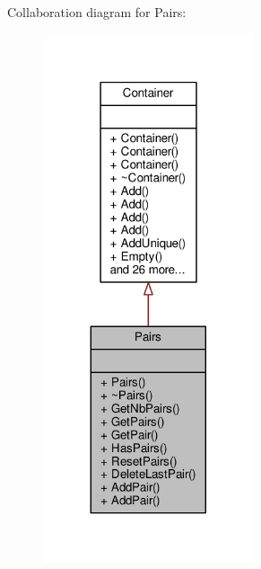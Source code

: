 Collaboration diagram for Pairs\+:
\nopagebreak
\begin{figure}[H]
\begin{center}
\leavevmode
\includegraphics[width=176pt]{da/d8f/classPairs__coll__graph}
\end{center}
\end{figure}
